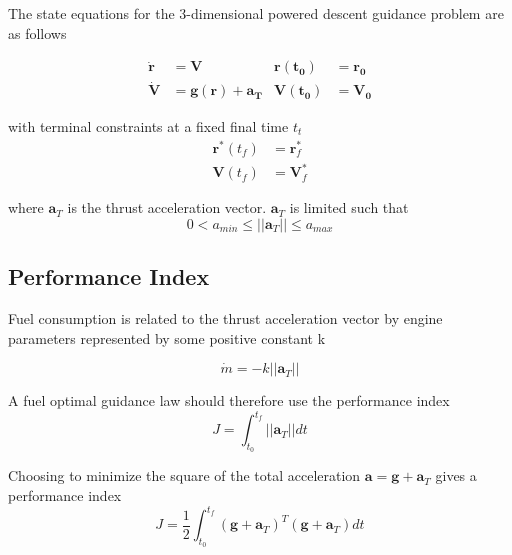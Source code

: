 The state equations for the 3-dimensional powered descent guidance problem are as follows

\begin{align}
\label{eqn:EoM1}
\boldsymbol{\dot{r}} &= \boldsymbol{V}                               & \boldsymbol{r(t_0)} &= \boldsymbol{r_0}\\
\label{eqn:EoM2}
\boldsymbol{\dot{V}} &= \boldsymbol{g(r)} + \boldsymbol{a_T}                           & \boldsymbol{V(t_0)} &= \boldsymbol{V_0}
\end{align}


with terminal constraints at a fixed final time $t_t$
\begin{align}
\label{eqn:constraint_r}
\boldsymbol{r}^*(t_f) &= \boldsymbol{r}^*_f\\
\label{eqn:constraint_V}
\boldsymbol{V}(t_f) &= \boldsymbol{V}^*_f 
\end{align}

where $\boldsymbol{a}_T$ is the thrust acceleration vector. $\boldsymbol{a}_T$ is limited such that
\begin{equation} 
\label{eqn:thrustlimit}
0 < a_{min} \leq ||\boldsymbol{a}_T|| \leq a_{max}
\end{equation}

\subsection{Performance Index}
Fuel consumption is related to the thrust acceleration vector by engine parameters represented by some positive constant k

\begin{equation}
\label{eqn:fuel_rate}
\dot{m} = -k ||\boldsymbol{a}_T||
\end{equation}

A fuel optimal guidance law should therefore use the performance index
\begin{equation}
\label{eqn:fueloptimalindex}
J = \int_{t_0}^{t_f} ||\boldsymbol{a}_T||dt
\end{equation}

Choosing to minimize the square of the total acceleration $\boldsymbol{a} = \boldsymbol{g} + \boldsymbol{a}_T$ gives a performance index
\begin{equation}
\label{eqn:performanceindex}
J = \frac{1}{2} \int_{t_0}^{t_f} (\boldsymbol{g}+\boldsymbol{a}_T)^T(\boldsymbol{g}+\boldsymbol{a}_T)dt
\end{equation}

